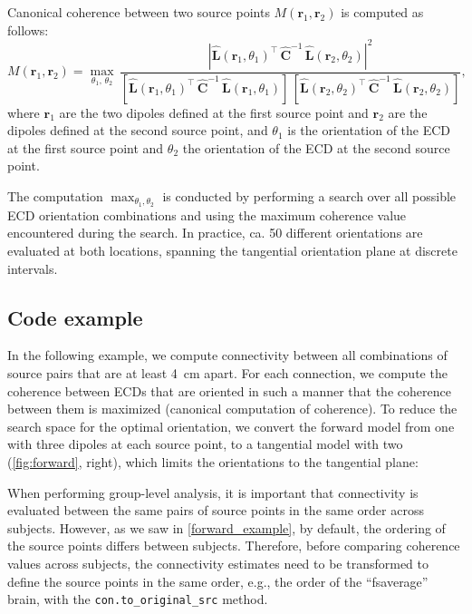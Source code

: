 \documentclass[utf8]{frontiersSCNS}
\newcommand{\code}[1]{\lstinline{#1}}
\newcommand{\bm}[1]{\mathbf{#1}}
\newcommand{\mat}[1]{\bm{#1}}
\renewcommand{\vec}[1]{\bm{#1}}
\newcommand{\trans}{^\intercal}
\begin{document}
Canonical coherence between two source points $M(\vec{r}_1, \vec{r}_2)$ is computed as follows:
\begin{equation}\label{eq:coherence}
    M(\vec{r}_1, \vec{r}_2) = \max_{\theta_1, \, \theta_2} \,
                              \frac{|\widehat{\vec{L}}{(\vec{r}_1, \theta_1)}\trans \, \widehat{\mat{C}}^{-1} \, \widehat{\vec{L}}(\vec{r}_2, \theta_2)|^2}
                                   {[\widehat{\vec{L}}{(\vec{r}_1, \theta_1)}\trans \, \widehat{\mat{C}}^{-1} \, \widehat{\vec{L}}(\vec{r}_1, \theta_1)] \,
                                    [\widehat{\vec{L}}{(\vec{r}_2, \theta_2)}\trans \, \widehat{\mat{C}}^{-1} \, \widehat{\vec{L}}(\vec{r}_2, \theta_2)]
                                   },
\end{equation}
where $\vec{r}_1$ are the two dipoles defined at the first source point and $\vec{r}_2$ are the dipoles defined at the second source point, and $\theta_1$ is the orientation of the ECD at the first source point and $\theta_2$ the orientation of the ECD at the second source point.

The computation $\max_{\theta_1, \theta_2}$ is conducted by performing a search over all possible ECD orientation combinations and using the maximum coherence value encountered during the search. In practice, ca. 50 different orientations are evaluated at both locations, spanning the tangential orientation plane at discrete intervals.

\subsection{Code example}

In the following example, we compute connectivity between all combinations of source pairs that are at least \SI{4}{\centi\meter} apart.
For each connection, we compute the coherence between ECDs that are oriented in such a manner that the coherence between them is maximized (canonical computation of coherence).
To reduce the search space for the optimal orientation, we convert the forward model from one with three dipoles at each source point, to a tangential model with two (\autoref{fig:forward}, right), which limits the orientations to the tangential plane:


When performing group-level analysis, it is important that connectivity is evaluated between the same pairs of source points in the same order across subjects.
However, as we saw in \autoref{forward_example}, by default, the ordering of the source points differs between subjects.
Therefore, before comparing coherence values across subjects, the connectivity estimates need to be transformed to define the source points in the same order, e.g., the order of the ``fsaverage'' brain, with the \code{con.to_original_src} method.
\end{document}
